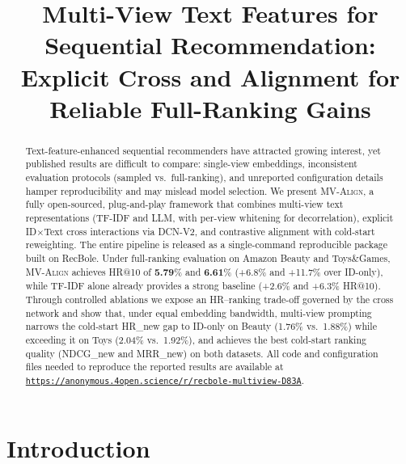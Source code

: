 \documentclass[sigconf,natbib=true,anonymous]{acmart}
\newcommand{\model}{\textsc{MV-Align}\xspace}
\newcommand{\tfidf}{\textsc{TF-IDF}\xspace}
\newcommand{\llm}{\textsc{LLM}\xspace}
\begin{document}
\title{Multi-View Text Features for Sequential Recommendation:\\
Explicit Cross and Alignment for Reliable Full-Ranking Gains}


\begin{abstract}
Text-feature-enhanced sequential recommenders have attracted growing interest, yet published results are difficult to compare: single-view embeddings, inconsistent evaluation protocols (sampled vs.\ full-ranking), and unreported configuration details hamper reproducibility and may mislead model selection.
%
We present \model, a fully open-sourced, plug-and-play framework that combines multi-view text representations (\tfidf and \llm, with per-view whitening for decorrelation), explicit ID$\times$Text cross interactions via DCN-V2, and contrastive alignment with cold-start reweighting.
The entire pipeline is released as a single-command reproducible package built on RecBole.
%
Under full-ranking evaluation on Amazon Beauty and Toys\&Games, \model achieves HR@10 of \textbf{5.79}\% and \textbf{6.61}\% (+6.8\% and +11.7\% over ID-only), while \tfidf alone already provides a strong baseline (+2.6\% and +6.3\% HR@10).
Through controlled ablations we expose an HR--ranking trade-off governed by the cross network and show that, under equal embedding bandwidth, multi-view prompting narrows the cold-start HR\_new gap to ID-only on Beauty (1.76\% vs.\ 1.88\%) while exceeding it on Toys (2.04\% vs.\ 1.92\%), and achieves the best cold-start ranking quality (NDCG\_new and MRR\_new) on both datasets.
All code and configuration files needed to reproduce the reported results are available at \texttt{\url{https://anonymous.4open.science/r/recbole-multiview-D83A}}.
\end{abstract}


\maketitle

\section{Introduction}
\end{document}
